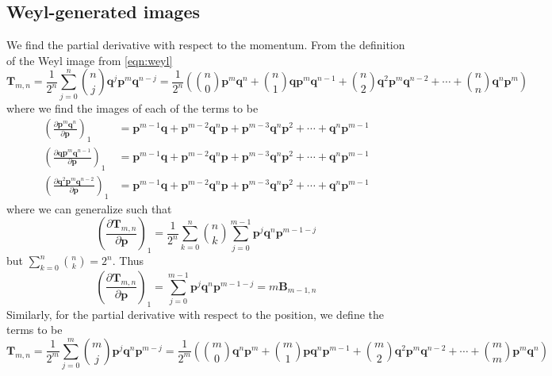 \documentclass[a4paper]{article}
\theoremstyle{definition}
\begin{document}
	\subsection{Weyl-generated images}
	We find the partial derivative with respect to the momentum. From the definition of the Weyl image from \ref{eqn:weyl}
	\begin{equation}
		\textbf{T}_{m,n}=\frac{1}{2^n}\sum_{j=0}^n\binom{n}{j}\textbf{q}^j\textbf{p}^m\textbf{q}^{n-j}=\frac{1}{2^n}\left(\binom{n}{0}\textbf{p}^m\textbf{q}^n+\binom{n}{1}\textbf{q}\textbf{p}^m\textbf{q}^{n-1}+\binom{n}{2}\textbf{q}^2\textbf{p}^m\textbf{q}^{n-2}+\cdots+\binom{n}{n}\textbf{q}^n\textbf{p}^m\right) 
	\end{equation}
	where we find the images of each of the terms to be
	\begin{align}
		\left(\frac{\partial\textbf{p}^m\textbf{q}^n}{\partial\textbf{p}}\right)_1&=\textbf{p}^{m-1}\textbf{q}+\textbf{p}^{m-2}\textbf{q}^n\textbf{p}+\textbf{p}^{m-3}\textbf{q}^n\textbf{p}^{2}+\cdots+\textbf{q}^n\textbf{p}^{m-1} \\
		\left(\frac{\partial\textbf{q}\textbf{p}^m\textbf{q}^{n-1}}{\partial\textbf{p}}\right)_1&=\textbf{p}^{m-1}\textbf{q}+\textbf{p}^{m-2}\textbf{q}^n\textbf{p}+\textbf{p}^{m-3}\textbf{q}^n\textbf{p}^{2}+\cdots+\textbf{q}^n\textbf{p}^{m-1} \\
		\left(\frac{\partial\textbf{q}^2\textbf{p}^m\textbf{q}^{n-2}}{\partial\textbf{p}}\right)_1&=\textbf{p}^{m-1}\textbf{q}+\textbf{p}^{m-2}\textbf{q}^n\textbf{p}+\textbf{p}^{m-3}\textbf{q}^n\textbf{p}^{2}+\cdots+\textbf{q}^n\textbf{p}^{m-1}
	\end{align}
	where we can generalize such that
	\begin{equation}
		\left(\frac{\partial\textbf{T}_{m,n}}{\partial\textbf{p}}\right)_1=\frac{1}{2^n}\sum_{k=0}^n\binom{n}{k}\sum_{j=0}^{m-1}\textbf{p}^j\textbf{q}^n\textbf{p}^{m-1-j}
	\end{equation}
	but $\displaystyle\sum_{k=0}^n\binom{n}{k}=2^n$. Thus
	\begin{equation}
		\left(\frac{\partial\textbf{T}_{m,n}}{\partial\textbf{p}}\right)_1=\sum_{j=0}^{m-1}\textbf{p}^j\textbf{q}^n\textbf{p}^{m-1-j}=m\textbf{B}_{m-1,n}
	\end{equation}
	Similarly, for the partial derivative with respect to the position, we define the terms to be
	\begin{equation}
		\textbf{T}_{m,n}=\frac{1}{2^m}\sum_{j=0}^m\binom{m}{j}\textbf{p}^j\textbf{q}^n\textbf{p}^{m-j}=\frac{1}{2^m}\left(\binom{m}{0}\textbf{q}^n\textbf{p}^m+\binom{m}{1}\textbf{p}\textbf{q}^n\textbf{p}^{m-1}+\binom{m}{2}\textbf{q}^2\textbf{p}^m\textbf{q}^{n-2}+\cdots+\binom{m}{m}\textbf{p}^m\textbf{q}^n\right) 
	\end{equation}
\end{document}
